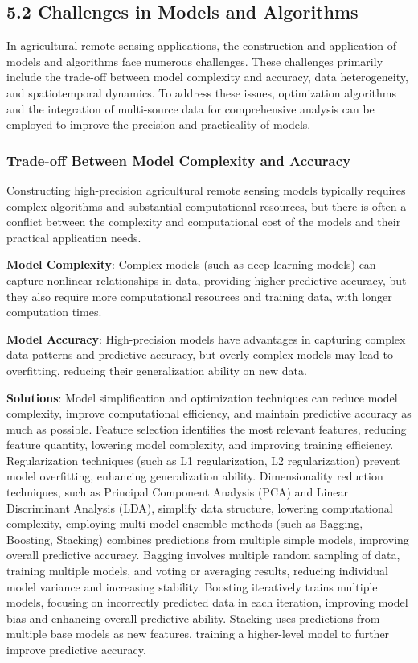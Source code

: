 \subsection{5.2 Challenges in Models and Algorithms}

In agricultural remote sensing applications, the construction and application of models and algorithms face numerous challenges. These challenges primarily include the trade-off between model complexity and accuracy, data heterogeneity, and spatiotemporal dynamics. To address these issues, optimization algorithms and the integration of multi-source data for comprehensive analysis can be employed to improve the precision and practicality of models.

\subsubsection{Trade-off Between Model Complexity and Accuracy}

Constructing high-precision agricultural remote sensing models typically requires complex algorithms and substantial computational resources, but there is often a conflict between the complexity and computational cost of the models and their practical application needs.

\textbf{Model Complexity}:
Complex models (such as deep learning models) can capture nonlinear relationships in data, providing higher predictive accuracy, but they also require more computational resources and training data, with longer computation times.

\textbf{Model Accuracy}:
High-precision models have advantages in capturing complex data patterns and predictive accuracy, but overly complex models may lead to overfitting, reducing their generalization ability on new data.

\textbf{Solutions}:
Model simplification and optimization techniques can reduce model complexity, improve computational efficiency, and maintain predictive accuracy as much as possible. Feature selection identifies the most relevant features, reducing feature quantity, lowering model complexity, and improving training efficiency. Regularization techniques (such as L1 regularization, L2 regularization) prevent model overfitting, enhancing generalization ability. Dimensionality reduction techniques, such as Principal Component Analysis (PCA) and Linear Discriminant Analysis (LDA), simplify data structure, lowering computational complexity, employing multi-model ensemble methods (such as Bagging, Boosting, Stacking) combines predictions from multiple simple models, improving overall predictive accuracy. Bagging involves multiple random sampling of data, training multiple models, and voting or averaging results, reducing individual model variance and increasing stability. Boosting iteratively trains multiple models, focusing on incorrectly predicted data in each iteration, improving model bias and enhancing overall predictive ability. Stacking uses predictions from multiple base models as new features, training a higher-level model to further improve predictive accuracy.

